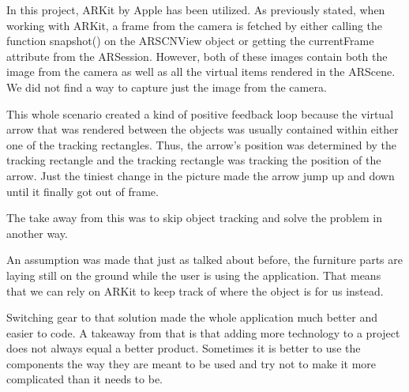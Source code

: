 In this project, ARKit by Apple has been utilized. As previously stated, when working with ARKit, a frame from the camera is fetched by either calling the function snapshot() on the ARSCNView object or getting the currentFrame attribute from the ARSession.
However, both of these images contain both the image from the camera as well as all the virtual items rendered in the ARScene. We did not find a way to capture just the image from  the camera.

This whole scenario created a kind of positive feedback loop because the virtual arrow that was rendered between the objects was usually contained within either one of the tracking rectangles. Thus, the arrow's position was determined by the tracking rectangle and the tracking rectangle was tracking the position of the arrow.
Just the tiniest change in the picture made the arrow jump up and down until it finally got out of frame.

The take away from this was to skip object tracking and solve the problem in another way.

An assumption was made that just as talked about before, the furniture parts are laying still on the ground while the user is using the application. That means that we can rely on ARKit to keep track of where the object is for us instead.

Switching gear to that solution made the whole application much better and easier to code. A takeaway from that is that adding more technology to a project does not always equal a better product. Sometimes it is better to use the components the way they are meant to be used and try not to make it more complicated than it needs to be.

\newpage